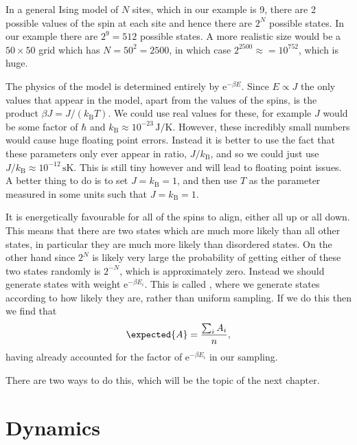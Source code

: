 \documentclass[fleqn]{NotesClass}
\newcommand*{\e}{\mathrm{e}}
\newcommand*{\boltzmann}{k_{\mathrm{B}}}
\begin{document}
    In a general Ising model of \(N\) sites, which in our example is 9, there are 2 possible values of the spin at each site and hence there are \(2^N\) possible states.
    In our example there are \(2^9 = 512\) possible states.
    A more realistic size would be a \(50 \times 50\) grid which has \(N = 50^2 = 2500\), in which case \(2^{2500} \approx = 10^{752}\), which is huge.
    
    The physics of the model is determined entirely by \(\e^{-\beta E}\).
    Since \(E \propto J\) the only values that appear in the model, apart from the values of the spins, is the product \(\beta J = J/(\boltzmann T)\).
    We could use real values for these, for example \(J\) would be some factor of \(\hbar\) and \(\boltzmann \approx 10^{-23}\,\unit{\joule\per\kelvin}\).
    However, these incredibly small numbers would cause huge floating point errors.
    Instead it is better to use the fact that these parameters only ever appear in ratio, \(J/\boltzmann\), and so we could just use \(J/\boltzmann \approx 10^{-12} \, \unit{\second \kelvin}\).
    This is still tiny however and will lead to floating point issues.
    A better thing to do is to set \(J = \boltzmann = 1\), and then use \(T\) as the parameter measured in some units such that \(J = \boltzmann = 1\).
    
    It is energetically favourable for all of the spins to align, either all up or all down.
    This means that there are two states which are much more likely than all other states, in particular they are much more likely than disordered states.
    On the other hand since \(2^N\) is likely very large the probability of getting either of these two states randomly is \(2^{-N}\), which is approximately zero.
    Instead we should generate states with weight \(\e^{-\beta E_i}\).
    This is called , where we generate states according to how likely they are, rather than uniform sampling.
    If we do this then we find that
    \begin{equation}
        \expected{A} = \frac{\sum_i A_i}{n},
    \end{equation}
    having already accounted for the factor of \(\e^{-\beta E_i}\) in our sampling.
    
    There are two ways to do this, which will be the topic of the next chapter.
    
    \chapter{Dynamics}
\end{document}
